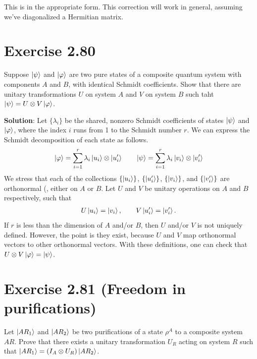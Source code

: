 \documentclass{book}
\begin{document}
    This is in the appropriate form. This correction will work in general, assuming we've diagonalized a Hermitian matrix. 

\section*{Exercise 2.80}
    Suppose $\ket{\psi}$ and $\ket{\varphi}$ are two pure states of a composite quantum system with components $A$ and $B$, with identical Schmidt coefficients. Show that there are unitary transformations $U$ on system $A$ and $V$ on system $B$ such taht $\ket{\psi} = U \otimes V \ket{\varphi}$.

    \textbf{Solution}: Let $\{\lambda_i\}$ be the shared, nonzero Schmidt coefficients of states $\ket{\psi}$ and $\ket{\varphi}$, where the index $i$ runs from 1 to the Schmidt number $r$. We can express the Schmidt decomposition of each state as follows.
    \begin{align}
        \ket{\varphi} = \sum_{i=1}^r \lambda_i \ket{u_i}\otimes \ket{u_i'} \qquad \ket{\psi} = \sum_{i=1}^r \lambda_i \ket{v_i}\otimes \ket{v_i'}
    \end{align}
    We stress that each of the collections $\{\ket{u_i}\}$, $\{\ket{u_i'}\}$, $\{\ket{v_i}\}$, and $\{\ket{v_i'}\}$ are orthonormal (, either on $A$ or $B$. Let $U$ and $V$ be unitary operations on $A$ and $B$ respectively, such that 
    \begin{align}
         U \ket{u_i} = \ket{v_i}, \qquad V \ket{u_i'} = \ket{v_i'}.
    \end{align}
    If $r$ is less than the dimension of $A$ and/or $B$, then $U$ and/or $V$ is not uniquely defined. However, the point is they exist, because $U$ and $V$ map orthonormal vectors to other orthonormal vectors. With these definitions, one can check that $U \otimes V \ket{\varphi} = \ket{\psi}$.

\section*{Exercise 2.81 (Freedom in purifications)}
    Let $\ket{A R_1}$ and $\ket{A R_2}$ be two purifications of a state $\rho^A$ to a composite system $AR$. Prove that there exists a unitary transformation $U_R$ acting on system $R$ such that $\ket{A R_1} = (I_A \otimes U_R) \ket{A R_2}$.
\end{document}
